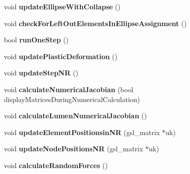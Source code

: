 \begin{DoxyCompactItemize}
\item 
\hypertarget{classSimulation_a0e7040a8ecc377bd2e53c785fc4c488b}{}void {\bfseries update\+Ellipse\+With\+Collapse} ()\label{classSimulation_a0e7040a8ecc377bd2e53c785fc4c488b}

\item 
\hypertarget{classSimulation_a065f2150d785ee160762367bd6419e42}{}void {\bfseries check\+For\+Left\+Out\+Elements\+In\+Ellipse\+Assignment} ()\label{classSimulation_a065f2150d785ee160762367bd6419e42}

\item 
\hypertarget{classSimulation_a300713fd91c15b51421606bffd6d87b7}{}bool {\bfseries run\+One\+Step} ()\label{classSimulation_a300713fd91c15b51421606bffd6d87b7}

\item 
\hypertarget{classSimulation_aba920b0ae2806ea3890cbe2b819977fe}{}void {\bfseries update\+Plastic\+Deformation} ()\label{classSimulation_aba920b0ae2806ea3890cbe2b819977fe}

\item 
\hypertarget{classSimulation_a6a869cb433953d1d36249460b0a74545}{}void {\bfseries update\+Step\+N\+R} ()\label{classSimulation_a6a869cb433953d1d36249460b0a74545}

\item 
\hypertarget{classSimulation_a3dcc05b01015d968de35b9cc5fc44062}{}void {\bfseries calculate\+Numerical\+Jacobian} (bool display\+Matrices\+During\+Numerical\+Calculation)\label{classSimulation_a3dcc05b01015d968de35b9cc5fc44062}

\item 
\hypertarget{classSimulation_ab96a56d140df7ba81a09eb3b634cef07}{}void {\bfseries calculate\+Lumen\+Numerical\+Jacobian} ()\label{classSimulation_ab96a56d140df7ba81a09eb3b634cef07}

\item 
\hypertarget{classSimulation_aed6fc494b468ebd56c07625d3e5984ff}{}void {\bfseries update\+Element\+Positionsin\+N\+R} (gsl\+\_\+matrix $\ast$uk)\label{classSimulation_aed6fc494b468ebd56c07625d3e5984ff}

\item 
\hypertarget{classSimulation_aea943e8e0caf1b9ff8e40b61248024b6}{}void {\bfseries update\+Node\+Positions\+N\+R} (gsl\+\_\+matrix $\ast$uk)\label{classSimulation_aea943e8e0caf1b9ff8e40b61248024b6}

\item 
\hypertarget{classSimulation_ae16977eb346093b2fe00f94e9c485b37}{}void {\bfseries calculate\+Random\+Forces} ()\label{classSimulation_ae16977eb346093b2fe00f94e9c485b37}


\end{DoxyCompactItemize}
